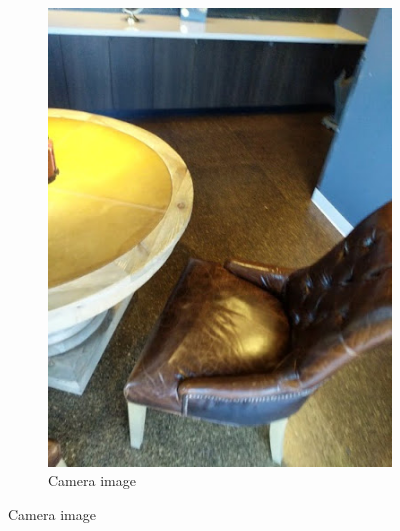 \begin{figure}[ht!]
\begin{subfigure}[b]{0.4\textwidth}
        \includegraphics[width=0.8\linewidth]{images/depth_camera-image}
        \caption{Camera image}
    \end{subfigure}%

    \vspace{0.5em}


\end{figure}
